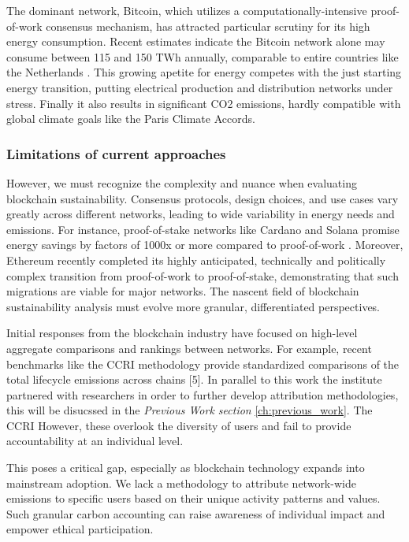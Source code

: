 \documentclass[11pt]{report}
\begin{document}
The dominant network, Bitcoin, which utilizes a computationally-intensive proof-of-work consensus mechanism, has attracted particular scrutiny for its high energy consumption. Recent estimates indicate the Bitcoin network alone may consume between 115 and 150 TWh annually, comparable to entire countries like the Netherlands \cite{devriesRevisitingBitcoinCarbon2022,neumuellerCambridgeBitcoinElectricity2021}. This growing apetite for energy competes with the just starting energy transition, putting electrical production and distribution networks under stress. Finally it also results in significant CO2 emissions, hardly compatible with global climate goals like the Paris Climate Accords.

\subsubsection*{Limitations of current approaches}
However, we must recognize the complexity and nuance when evaluating blockchain sustainability. Consensus protocols, design choices, and use cases vary greatly across different networks, leading to wide variability in energy needs and emissions. For instance, proof-of-stake networks like Cardano and Solana promise energy savings by factors of 1000x or more compared to proof-of-work \cite{kohliAnalysisEnergyConsumption2023}. Moreover, Ethereum recently completed its highly anticipated, technically and politically complex transition from proof-of-work to proof-of-stake, demonstrating that such migrations are viable for major networks. \cite{bloombergnewsEthereumMergeYour2022} The nascent field of blockchain sustainability analysis must evolve more granular, differentiated perspectives.

Initial responses from the blockchain industry have focused on high-level aggregate comparisons and rankings between networks. For example, recent benchmarks like the \ac{CCRI} methodology provide standardized comparisons of the total lifecycle emissions across chains [5]. In parallel to this work the institute partnered with researchers in order to further develop attribution methodologies, this will be disucssed in the \textit{Previous Work section} \ref{ch:previous_work}. The CCRI However, these overlook the diversity of users and fail to provide accountability at an individual level.

This poses a critical gap, especially as blockchain technology expands into mainstream adoption. We lack a methodology to attribute network-wide emissions to specific users based on their unique activity patterns and values. Such granular carbon accounting can raise awareness of individual impact and empower ethical participation.
\end{document}
